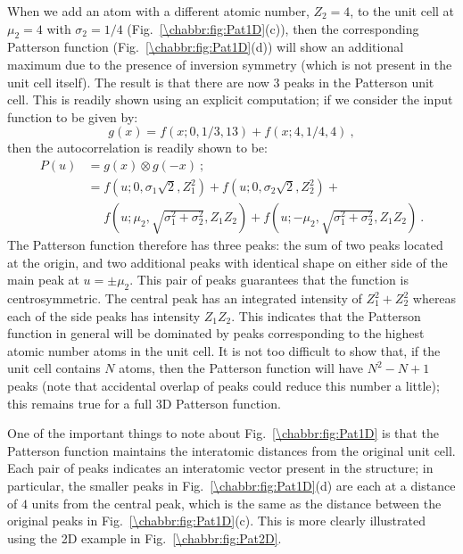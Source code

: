 When we add an atom with a different atomic number, $Z_2=4$, to the unit cell at $\mu_2=4$ with $\sigma_2=1/4$ (Fig.~\ref{\chabbr:fig:Pat1D}(c)), then the corresponding Patterson function (Fig.~\ref{\chabbr:fig:Pat1D}(d)) will show an additional maximum due to the presence of inversion symmetry (which is not present in the unit cell itself). The result is that there are now $3$ peaks in the Patterson unit cell. This is readily shown using an explicit computation; if we consider the input function to be given by:
\[
	g(x) = f(x;0,1/3,13) + f(x;4,1/4,4)\ ,
\]
then the autocorrelation is readily shown to be:
\begin{equation*}
\begin{split}
	P(u) &= g(x)\otimes g(-x)\ ;\\
	&= f(u;0,\sigma_1\sqrt{2},Z_1^2)+f(u;0,\sigma_2\sqrt{2},Z_2^2)+\\
	&\quad \,\, f(u;\mu_2,\sqrt{\sigma_1^2+\sigma_2^2},Z_1Z_2)+f(u;-\mu_2,\sqrt{\sigma_1^2+\sigma_2^2},Z_1Z_2)\ .
\end{split}
\end{equation*}
The Patterson function therefore has three peaks: the sum of two peaks located at the origin, and two additional peaks with identical shape on either side of the main peak at $u=\pm \mu_2$. This pair of peaks guarantees that the function is centrosymmetric. The central peak has an integrated intensity of $Z_1^2+Z_2^2$ whereas each of the side peaks has intensity $Z_1 Z_2$.  This indicates that the Patterson function in general will be dominated by peaks corresponding to the highest atomic number atoms in the unit cell.  It is not too difficult to show that, if the unit cell contains $N$ atoms, then the Patterson function will have $N^2-N+1$ peaks (note that accidental overlap of peaks could reduce this number a little); this remains true for a full 3D Patterson function.

One of the important things to note about Fig.~\ref{\chabbr:fig:Pat1D} is that the Patterson function maintains the interatomic distances from the original unit cell. Each pair of peaks indicates an interatomic vector present in the structure; in particular, the smaller peaks in Fig.~\ref{\chabbr:fig:Pat1D}(d) are each at a distance of $4$ units from the central peak, which is the same as the distance between the original peaks in Fig.~\ref{\chabbr:fig:Pat1D}(c).  This is more clearly illustrated using the 2D example in Fig.~\ref{\chabbr:fig:Pat2D}.   



